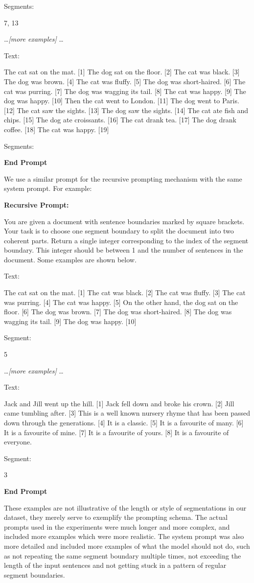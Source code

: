 Segments: 

7, 13

\ldots \emph{[more examples]} \ldots

Text: 

The cat sat on the mat. [1] The dog sat on the floor. [2] The cat was black. [3] The dog was brown. [4] The cat was fluffy. [5] The dog was short-haired. [6] The cat was purring. [7] The dog was wagging its tail. [8] The cat was happy. [9] The dog was happy. [10] Then the cat went to London. [11] The dog went to Paris. [12] The cat saw the sights. [13] The dog saw the sights. [14] The cat ate fish and chips. [15] The dog ate croissants. [16] The cat drank tea. [17] The dog drank coffee. [18] The cat was happy. [19]

Segments:

\textbf{End Prompt}

We use a similar prompt for the recursive prompting mechanism with the same system prompt. For example:

\textbf{Recursive Prompt:}

You are given a document with sentence boundaries marked by square brackets. Your task is to choose one segment boundary to split the document into two coherent parts. Return a single integer corresponding to the index of the segment boundary. This integer should be between 1 and the number of sentences in the document. Some examples are shown below.

Text:

The cat sat on the mat. [1] The cat was black. [2] The cat was fluffy. [3] The cat was purring. [4] The cat was happy. [5] On the other hand, the dog sat on the floor. [6] The dog was brown. [7] The dog was short-haired. [8] The dog was wagging its tail. [9] The dog was happy. [10]

Segment:

5

\ldots \emph{[more examples]} \ldots

Text: 

Jack and Jill went up the hill. [1] Jack fell down and broke his crown. [2] Jill came tumbling after. [3] This is a well known nursery rhyme that has been passed down through the generations. [4] It is a classic. [5] It is a favourite of many. [6] It is a favourite of mine. [7] It is a favourite of yours. [8] It is a favourite of everyone.

Segment:

3

\textbf{End Prompt}

These examples are not illustrative of the length or style of segmentations in our dataset, they merely serve to exemplify the prompting schema. The actual prompts used in the experiments were much longer and more complex, and included more examples which were more realistic. The system prompt was also more detailed and included more examples of what the model should not do, such as not repeating the same segment boundary multiple times, not exceeding the length of the input sentences and not getting stuck in a pattern of regular segment boundaries.